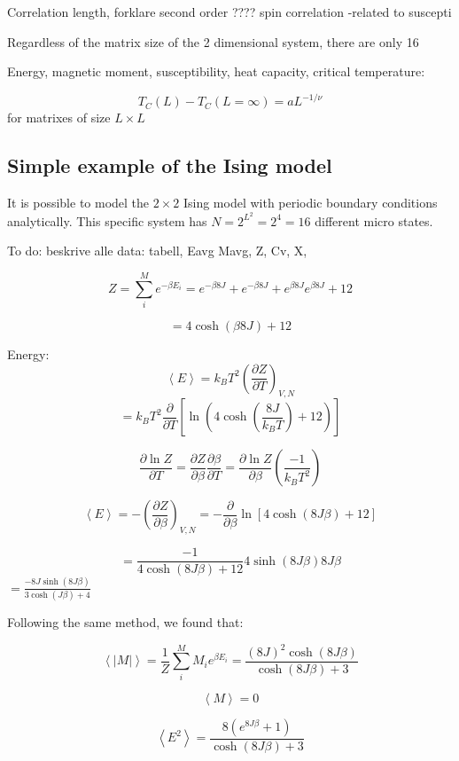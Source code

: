 Correlation length, forklare second order ????
spin correlation -related to suscepti


Regardless of the matrix size of the 2 dimensional system, there are only 16 



Energy, magnetic moment, susceptibility, heat capacity, critical temperature:


\begin{equation}\label{eq:critical_T}
T_C(L) - T_C(L=\infty) = a L^{-1/\nu}
\end{equation}
for matrixes of size $ L\times L $

\subsection{Simple example of the Ising model}

It is possible to model the $ 2\times 2 $ Ising model with periodic boundary conditions analytically. This specific system has $ N = 2^{L^2} = 2^4=16 $ different micro states.

To do:  beskrive alle data: tabell,  Eavg Mavg, Z, Cv, X, 


\[
Z = \sum_i^M e^{-\beta E_i} = e^{-\beta 8 J} + e^{-\beta 8 J} + e^{\beta 8 J}e^{\beta 8 J} + 12
\]

\[
= 4 \cosh\left( \beta 8 J \right) + 12
\]


Energy:
\[
\left< E \right> = k_B T^2 \left(\frac{\partial Z}{\partial T}
\right)_{V,N}
\]
\[
= k_B T^2 \frac{\partial}{\partial T} \left[\ln \left(4\cosh \left(\frac{8J}{k_BT}\right) +12\right) \right]\]

\[
\frac{\partial \ln Z}{\partial T} = \frac{\partial Z}{\partial \beta}\frac{\partial \beta}{\partial T} = \frac{\partial \ln Z}{\partial \beta}\left(\frac{-1}{k_B T^2}\right)
\]

\[
\left< E\right> = -\left(\frac{\partial Z}{\partial \beta} \right)_{V,N} = - \frac{\partial}{\partial \beta} \ln \left[ 4 \cosh \left( 8J\beta\right)+12\right]
\]

\[
= \frac{-1}{4\cosh (8J\beta) + 12}4 \sinh(8J\beta)8J\beta
\]
$
= \frac{-8J \sinh(8J\beta)}{3\cosh(J\beta)+ 4}
$

Following the same method, we found that:

\[
\left< |M| \right> = \frac{1}{Z} \sum_i^M M_i e^{\beta E_i}  = \frac{(8J)^2 \cosh(8J\beta )}{\cosh (8J\beta ) + 3}
\]

\[
\left< M \right> = 0
\]

\[
\left< E^2 \right> = \frac{8 \left( e^{8J\beta } + 1\right) }{\cosh (8J\beta ) + 3}
\]


